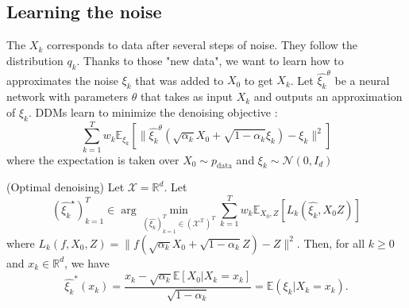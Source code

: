 \documentclass[12pt]{article}
\begin{document}
\subsection{Learning the noise}

The $X_k$ corresponds to data after several steps of noise. They follow the distribution $q_k$. 
Thanks to those "new data", we want to learn how to approximates the noise $\xi_k$ 
that was added to $X_0$ to get $X_k$. 
Let $\hat{\xi_k}^\theta$ be a neural network with parameters $\theta$ that takes as input $X_k$ and
outputs an approximation of $\xi_k$. DDMs learn to minimize the denoising objective : 
\begin{equation}
\sum_{k=1}^T w_k \mathbb{E}_{\xi_k} 
\left[ \| \hat{\xi_k}^\theta (\sqrt{\alpha_k}X_0 + \sqrt{1 - \alpha_k} \xi_k) - \xi_k \|^2 \right]
\end{equation}
where the expectation is taken over $X_0 \sim p_{\text{data}}$ and $\xi_k \sim \mathcal{N}(0, I_d)$ 

\begin{assumption}{(Optimal denoising)}
    \label{ass:optimal_denoising}
    Let $\mathcal{X} = \mathbb{R}^d$.
    Let $$(\hat{\xi_k}^\star)_{k=1}^T \in 
    \arg \min_{(\hat{\xi_k})_{k=1}^T \in (\mathcal{X}^\mathcal{X})^T} 
    \sum_{k=1}^T w_k \mathbb{E}_{X_0,Z}[L_k(\hat{\xi_k},X_0 Z)]$$
    where $L_k(f, X_0, Z) = \| f(\sqrt{\alpha_k}X_0 + \sqrt{1 - \alpha_k} Z) - Z \|^2$.
    Then, for all $k \geq 0$ and $x_k \in \mathbb{R}^d$, we have
    \begin{equation}
    \label{eq:noise_estimator}
    \hat{\xi_k}^{*} (x_k) = 
    \frac{x_k - \sqrt{\alpha_k} \mathbb{E}[ X_0| X_k = x_k]}{\sqrt{1 - \alpha_k}} = \mathbb{E}(\xi_k | X_k = x_k).
    \end{equation}
\end{assumption}
\end{document}
